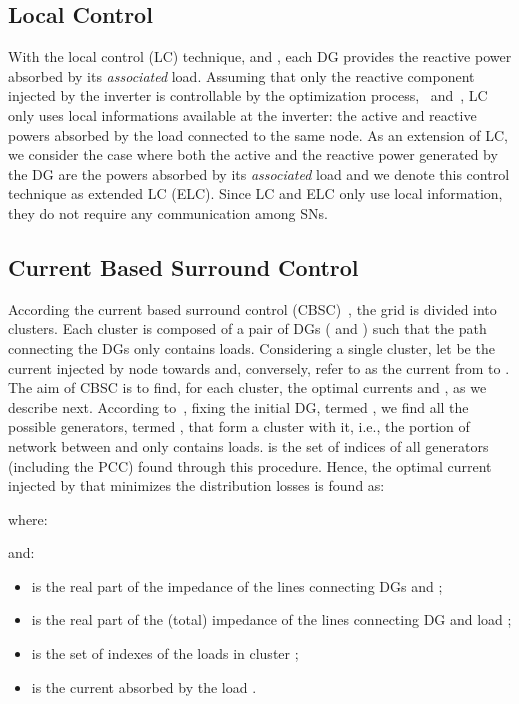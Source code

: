 \documentclass[journal]{IEEEtran}
\begin{document}
\subsection{Local Control}
\label{ssec:LControl}

With the local control (LC) technique, \cite{LC} and \cite{OptionsLC}, each DG provides the reactive power absorbed by its \textit{associated} load. Assuming that only the reactive component injected by the inverter is controllable by the optimization process,~\cite{LC} and~\cite{OptionsLC}, LC only uses local informations available at the inverter: the active and reactive powers absorbed by the load connected to the same node. As an extension of LC, we consider the case where both the active and the reactive power generated by the DG are the powers absorbed by its \textit{associated} load and we denote this control technique as extended LC (ELC). Since LC and ELC only use local information, they do not require any communication among SNs.

\subsection{Current Based Surround Control}
\label{ssec:CBControl}

According the current based surround control (CBSC)~\cite{SurroundControl}, the grid is divided into clusters. Each cluster is composed of a pair of DGs ( and ) such that the path connecting the DGs only contains loads. Considering a single cluster, let  be the current injected by node  towards  and, conversely, refer to  as the current from  to . The aim of CBSC is to find, for each cluster, the optimal currents  and , as we describe next. According to~\cite{SurroundControl}, fixing the initial DG, termed , we find all the possible generators, termed , that form a cluster with it, i.e., the portion of network between  and  only contains loads.  is the set of indices of all generators  (including the PCC) found through this procedure. Hence, the optimal current injected by  that minimizes the distribution losses is found as:

where:

and:
\begin{itemize}
\item  is the real part of the impedance  of the lines connecting DGs  and ;
\item  is the real part of the (total) impedance  of the lines connecting DG  and load ;
\item  is the set of indexes of the loads in cluster ;
\item  is the current absorbed by the load  .
\end{itemize}
\end{document}
